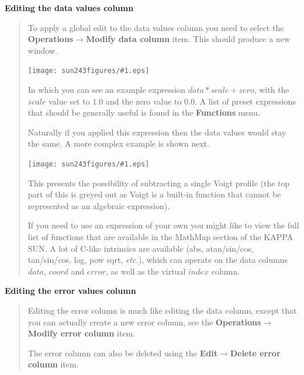 \documentclass[twoside,11pt]{article}
\newcommand{\htmladdimg}[1]{}
\newcommand{\latexhtml}[2]{#1}
\newcommand{\xref}[3]{#1}
\renewcommand{\_}{\texttt{\symbol{95}}}
\newcommand{\mainfigure}[1]
{\begin{center}
 \latexhtml{\texttt{[image: sun243\_figures/\#1.eps]}}{\htmladdimg{#1.gif}}
 \end{center}
}
\newcommand{\menuitem}[1]{\textbf{#1}}
\newcommand{\submenuitem}[2]{\latexhtml{\textbf{#1$\rightarrow$#2}}{\textbf{#1->#2}}}
\newcommand{\etc}{\textit{etc.}}
\newcommand{\subheading}[1]{\textbf{\large{#1}}}
\begin{document}
\subheading{Editing the data values column}
\begin{quote}
 To apply a global edit to the data values column you need to select
 the \submenuitem{Operations}{Modify data column} item. This should
 produce a new window.

 \mainfigure{dataeditwindow}

 In which you can see an example expression $data*scale+zero$, with
 the $scale$ value set to $1.0$ and the zero value to $0.0$. A list of
 preset expressions that should be generally useful is found in the
 \menuitem{Functions} menu.

 Naturally if you applied this expression then the data values would
 stay the same. A more complex example is shown next.

 \mainfigure{dataeditwindow2}

 This presents the possibility of subtracting a single Voigt profile
 (the top part of this is greyed out as Voigt is a built-in function
 that cannot be represented as an algebraic expression).

 If you need to use an expression of your own you might like to view
 the full list of functions that are available in the MathMap section
 of the \xref{KAPPA SUN}{sun95}{ap_MathMaps}. A lot of C-like
 intrinsics are available (abs, atan/sin/cos, tan/sin/cos, log, pow
 sqrt, \etc), which can operate on the data columns $data$, $coord$
 and $error$, as well as the virtual $index$ column.
\end{quote}

\subheading{Editing the error values column}
\begin{quote}
 Editing the error column is much like editing the data column, except
 that you can actually create a new error column, see the
 \submenuitem{Operations}{Modify error column} item.

 The error column can also be deleted using the
 \submenuitem{Edit}{Delete error column} item.
\end{quote}
\end{document}
